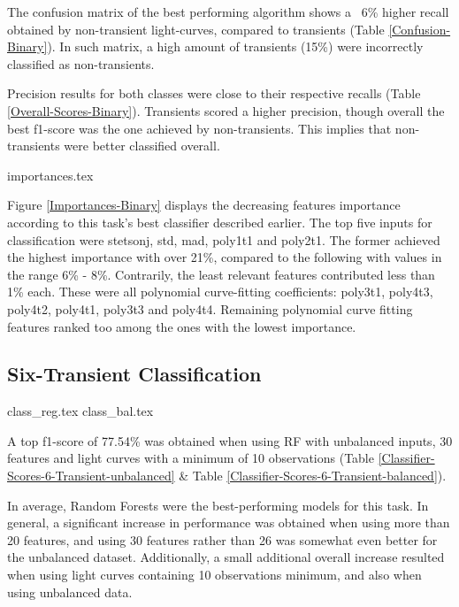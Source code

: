 The confusion matrix of the best performing algorithm shows a ~6\% higher recall obtained by non-transient light-curves, compared to transients (Table \ref{Confusion-Binary}). In such matrix, a high amount of transients (15\%) were incorrectly classified as non-transients.

Precision results for both classes were close to their respective recalls (Table \ref{Overall-Scores-Binary}). Transients scored a higher precision, though overall the best f1-score was the one achieved by non-transients. This implies that non-transients were better classified overall.

{importances.tex}

Figure \ref{Importances-Binary} displays the decreasing features importance according to this task's best classifier described earlier. The top five inputs for classification were
stetson\textunderscore j, std, mad, poly1\textunderscore t1 and poly2\textunderscore t1. The former achieved the highest importance with over 21\%, compared to the following with values in the range 6\% - 8\%. Contrarily, the least relevant features contributed less than 1\% each. These were all polynomial curve-fitting coefficients: 
poly3\textunderscore t1, poly4\textunderscore t3, poly4\textunderscore t2, poly4\textunderscore t1, poly3\textunderscore t3 and poly4\textunderscore t4. Remaining polynomial curve fitting features ranked too among the ones with the lowest importance.


\subsection{Six-Transient Classification}

{class_reg.tex}
{class_bal.tex}

A top f1-score of 77.54\% was obtained when using RF with unbalanced inputs, 30 features and light curves with a minimum of 10 observations (Table \ref{Classifier-Scores-6-Transient-unbalanced} \& Table \ref{Classifier-Scores-6-Transient-balanced}).

In average, Random Forests were the best-performing models for this task. In general, a significant increase in performance was obtained when using more than 20 features, and using 30 features rather than 26 was somewhat even better for the unbalanced dataset. Additionally, a small additional overall increase resulted when using light curves containing 10 observations minimum, and also when using unbalanced data.

